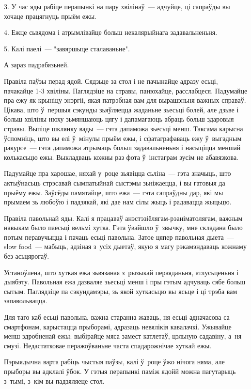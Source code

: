 3. У час яды рабіце перапынкі на пару хвілінаў~--- адчуйце, ці сапраўды вы хочаце працягнуць прыём ежы.

4. Ежце сьвядома і атрымлівайце больш некалярыйнага задавальненьня.

5. Калі паелі~--- "завяршыце сталаваньне".

А зараз падрабязьней.

Правіла паўзы перад ядой. Сядзьце за стол і не пачынайце адразу есьці, пачакайце 1-3 хвіліны. Паглядзіце на стравы, панюхайце, расслабцеся. Падумайце пра ежу як крыніцу энэргіі, якая патрэбная вам для вырашэньня важных справаў. Цікава, што ў~першыя сэкунды зьяўляецца жаданьне зьесьці болей, але дзьве і больш хвіліны нюху зьмяншаюць цягу і дапамагаюць абраць больш здаровыя стравы. Выпіце шклянку вады~--- гэта дапаможа зьесьці менш. Таксама карысна ўспомніць, што вы елі ў~мінулы прыём ежы, і сфатаграфаваць ежу ў~выгадным ракурсе~--- гэта дапаможа атрымаць больш задавальненьня і насыціцца меншай колькасьцю ежы. Выкладваць кожны раз фота ў~інстаграм зусім не абавязкова.

Падумайце пра харошае, няхай у~роце зьявіцца сьліна~--- гэта значыць, што актыўнасьць стрэсавай сымпатыйнай сыстэмы зьніжаецца, і вы гатовыя да прыёму ежы. Заўсёды памятайце, што ежа~--- гэта сапраўдны дар, які мы прымаем зь любоўю і падзякай, які дае нам сілы жыць і радавацца жыцьцю.

Правіла павольнай яды. Калі я працаваў анэстэзіёлягам-рэаніматолягам, важным навыкам было паесьці вельмі хутка. Гэта ўвайшло ў~звычку, мне складана было потым перавучыцца і пачаць есьці павольна. Затое цяпер павольная дыета~--- slow food~--- мабыць, адзіная з~усіх дыетаў, якую я магу рэкамэндаваць кожнаму без асьцярогаў.

Устаноўлена, што хуткая ежа зьвязаная з~рызыкай пераяданьня, атлусьценьня і дыябэту. Павольная ежа дазваляе зьесьці менш і пры гэтым адчуваць сябе больш сытым. Паглядзіце па сэкундамэры, зь якой хуткасьцю вы ясьце і ці трэба вам запавольвацца.

Для таго каб есьці павольна, важна старанна жаваць, ня есьці адначасова са смартфонам, карыстацца прыборамі, адразаць невялікія кавалачкі. Ужывайце менш здробненай ежы: выбірайце мяса замест катлетаў, цэльную садавіну, а~ня смузі. Недастатковае перажоўваньне часта спадарожнічае хуткай ежы.

Пэрыядычна варта рабіць чыстыя паўзы, калі ў~роце ўжо нічога няма, але прыборы вы адклалі ўбок. У гэтыя перапынкі паміж ядойй можна пагутарыць з~тымі, з~кім вы падзяляеце стол.

